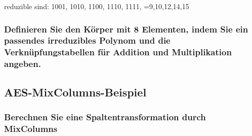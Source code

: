 reduzible sind: 
1001,
1010,
1100,
1110, 
1111, 
=9,10,12,14,15 \\

\subsubsection{Definieren Sie den Körper mit 8 Elementen, indem Sie ein passendes
irreduzibles Polynom und die Verknüpfungstabellen für Addition und
Multiplikation angeben.}

\subsection{AES-MixColumns-Beispiel}
 \subsubsection{Berechnen Sie eine Spaltentransformation durch MixColumns}
